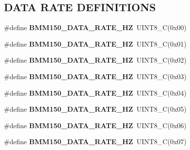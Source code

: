 \subsection*{D\+A\+TA R\+A\+TE D\+E\+F\+I\+N\+I\+T\+I\+O\+NS}
\begin{DoxyCompactItemize}
\item 
\mbox{\label{group___b_m_m150_ga49bd59d71923ec7365532fe85932eba8}} 
\#define {\bfseries B\+M\+M150\+\_\+\+D\+A\+T\+A\+\_\+\+R\+A\+T\+E\+\_\+HZ}~U\+I\+N\+T8\+\_\+C(0x00)
\item 
\mbox{\label{group___b_m_m150_ga2d1c67e005d23558b15d69d13cb24a2e}} 
\#define {\bfseries B\+M\+M150\+\_\+\+D\+A\+T\+A\+\_\+\+R\+A\+T\+E\+\_\+HZ}~U\+I\+N\+T8\+\_\+C(0x01)
\item 
\mbox{\label{group___b_m_m150_gaae81f66171c9443f458ba233953a34d6}} 
\#define {\bfseries B\+M\+M150\+\_\+\+D\+A\+T\+A\+\_\+\+R\+A\+T\+E\+\_\+HZ}~U\+I\+N\+T8\+\_\+C(0x02)
\item 
\mbox{\label{group___b_m_m150_gaf52fa42e52cc3a250f028f86035974ee}} 
\#define {\bfseries B\+M\+M150\+\_\+\+D\+A\+T\+A\+\_\+\+R\+A\+T\+E\+\_\+HZ}~U\+I\+N\+T8\+\_\+C(0x03)
\item 
\mbox{\label{group___b_m_m150_ga2720c433abcb58b10a05e2df4e19eb51}} 
\#define {\bfseries B\+M\+M150\+\_\+\+D\+A\+T\+A\+\_\+\+R\+A\+T\+E\+\_\+HZ}~U\+I\+N\+T8\+\_\+C(0x04)
\item 
\mbox{\label{group___b_m_m150_gaec2da85c333c50753ea44752763b0c4a}} 
\#define {\bfseries B\+M\+M150\+\_\+\+D\+A\+T\+A\+\_\+\+R\+A\+T\+E\+\_\+HZ}~U\+I\+N\+T8\+\_\+C(0x05)
\item 
\mbox{\label{group___b_m_m150_gab0a3a07222ec43ae4ccabd44bf35f47d}} 
\#define {\bfseries B\+M\+M150\+\_\+\+D\+A\+T\+A\+\_\+\+R\+A\+T\+E\+\_\+HZ}~U\+I\+N\+T8\+\_\+C(0x06)
\item 
\mbox{\label{group___b_m_m150_ga110129672608d8f357074ea7e3a911fa}} 
\#define {\bfseries B\+M\+M150\+\_\+\+D\+A\+T\+A\+\_\+\+R\+A\+T\+E\+\_\+HZ}~U\+I\+N\+T8\+\_\+C(0x07)
\end{DoxyCompactItemize}
